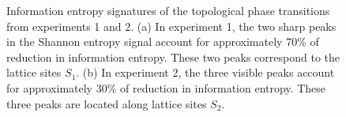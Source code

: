 \documentclass[10pt]{revtex4-1}
\begin{document}
\begin{figure}
\centering
{}\quad
{}\quad
\caption{Information entropy signatures of the topological phase transitions from experiments 1 and 2. (a) In experiment 1, the two sharp peaks in the Shannon entropy signal account for approximately 70\% of reduction in information entropy. These two peaks correspond to the lattice sites $S_1$. (b) In experiment 2, the three visible peaks account for approximately 30\% of reduction in information entropy. These three peaks are located along lattice sites $S_2$.}
\label{feature_importances}
\end{figure}
\end{document}
